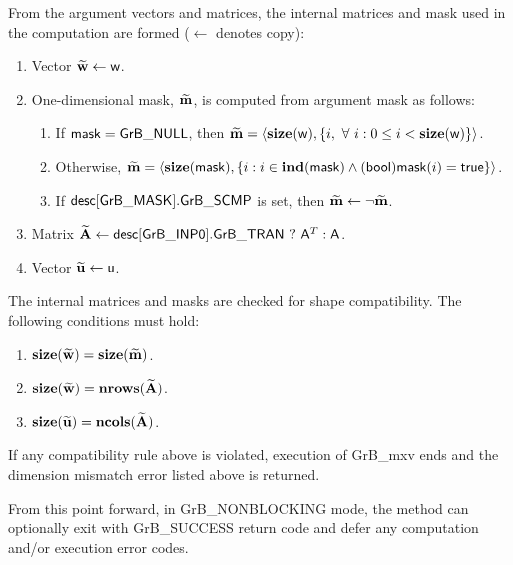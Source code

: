 From the argument vectors and matrices, the internal matrices and mask used in 
the computation are formed ($\leftarrow$ denotes copy):
\begin{enumerate}
	\item Vector ${\bf \widetilde{w}} \leftarrow {\sf w}$.

	\item One-dimensional mask, ${\bf \widetilde{m}}$, is computed from 
    argument {\sf mask} as follows:
	\begin{enumerate}
		\item	If ${\sf mask} = {\sf GrB\_NULL}$, then ${\bf \widetilde{m}} = 
        \langle \bold{size}({\sf w}), \{i, \ \forall \ i : 0 \leq i < 
        \bold{size}({\sf w}) \} \rangle$.

		\item	Otherwise, ${\bf \widetilde{m}} = 
        \langle \bold{size}({\sf mask}), \{i : i \in \bold{ind}({\sf mask}) \wedge
        ({\sf bool}){\sf mask}(i) = {\sf true} \} \rangle$.

		\item	If ${\sf desc[GrB\_MASK].GrB\_SCMP}$ is set, then 
        ${\bf \widetilde{m}} \leftarrow \neg {\bf \widetilde{m}}$.
	\end{enumerate}

	\item Matrix ${\bf \widetilde{A}} \leftarrow {\sf desc[GrB\_INP0].GrB\_TRAN} \ ? \ {\sf A}^T : {\sf A}$.

	\item Vector ${\bf \widetilde{u}} \leftarrow {\sf u}$.
\end{enumerate}

The internal matrices and masks are checked for shape compatibility. The following 
conditions must hold:
\begin{enumerate}
	\item $\bold{size}({\bf \widetilde{w}}) = \bold{size}({\bf \widetilde{m}})$.

	\item $\bold{size}({\bf \widetilde{w}}) = \bold{nrows}({\bf \widetilde{A}})$.

	\item $\bold{size}({\bf \widetilde{u}}) = \bold{ncols}({\bf \widetilde{A}})$.
\end{enumerate}
If any compatibility rule above is violated, execution of {\sf GrB\_mxv} ends and 
the dimension mismatch error listed above is returned.

From this point forward, in {\sf GrB\_NONBLOCKING} mode, the method can 
optionally exit with {\sf GrB\_SUCCESS} return code and defer any computation 
and/or execution error codes.

